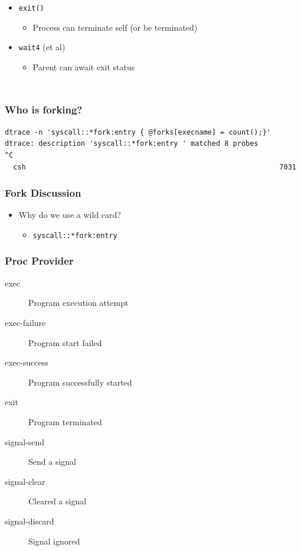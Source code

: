 \documentclass[pdftex]{beamer} %
\begin{document}
\begin{frame}
\begin{columns}[T]
\begin{itemize}
      \pause

      \item \texttt{exit()}
      \begin{itemize}
	\item Process can terminate self (or be terminated)
      \end{itemize}

      \pause

      \item \texttt{wait4} (et al)
      \begin{itemize}
	\item Parent can await exit status
      \end{itemize}
    \end{itemize}
  \end{columns}
\end{frame}

\begin{frame}[fragile]
  \frametitle{Who is forking?}
\begin{lstlisting}
dtrace -n 'syscall::*fork:entry { @forks[execname] = count();}'
dtrace: description 'syscall::*fork:entry ' matched 8 probes
^C
  csh                                                            7031
\end{lstlisting}
\end{frame}

\begin{frame}[fragile]
  \frametitle{Fork Discussion}
  \begin{itemize}
  \item Why do we use a wild card?
    \begin{itemize}
    \item \verb+syscall::*fork:entry+
    \end{itemize}
  \end{itemize}
\end{frame}

\begin{frame}
  \frametitle{Proc Provider}
  \begin{description}
  \item[exec] Program execution attempt
  \item[exec-failure] Program start failed
  \item[exec-success] Program successfully started
  \item[exit] Program terminated
  \item[signal-send] Send a signal
  \item[signal-clear] Cleared a signal
  \item[signal-discard] Signal ignored
  \end{description}
\end{frame}
\end{document}
